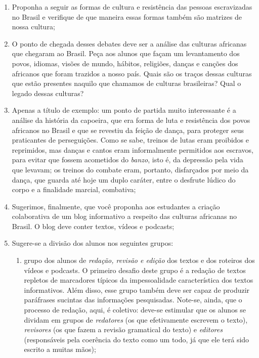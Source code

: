 \documentclass[12pt]{extarticle}
\begin{document}
\begin{enumerate}
\item Proponha a seguir as formas de cultura e resistência das pessoas
escravizadas no Brasil e verifique de que maneira essas formas também
são matrizes de nossa cultura;

\item O ponto de chegada desses debates deve ser a análise das culturas
africanas que chegaram ao Brasil. Peça aos alunos que façam um
levantamento dos povos, idiomas, visões de mundo, hábitos, religiões,
danças e canções dos africanos que foram trazidos a nosso país. Quais
são os traços dessas culturas que estão presentes naquilo que chamamos
de culturas brasileiras? Qual o legado dessas culturas?

\item Apenas a título de exemplo: um ponto de partida muito interessante é
a análise da história da capoeira, que era forma de luta e resistência
dos povos africanos no Brasil e que se revestiu da feição de dança, para
proteger seus praticantes de perseguições. Como se sabe, treinos de
lutas eram proibidos e reprimidos, mas danças e cantos eram
informalmente permitidos aos escravos, para evitar que fossem acometidos
do \emph{banzo}, isto é, da depressão pela vida que levavam; os treinos
do combate eram, portanto, disfarçados por meio da dança, que guarda até
hoje um duplo caráter, entre o desfrute lúdico do corpo e a finalidade
marcial, combativa;

\item Sugerimos, finalmente, que você proponha aos estudantes a criação
colaborativa de um blog informativo a respeito das culturas africanas no
Brasil. O blog deve conter textos, vídeos e podcasts;

\item Sugere-se a divisão dos alunos nos seguintes grupos:

\begin{enumerate}
\item grupo dos alunos de \emph{redação, revisão e edição} dos textos e dos
roteiros dos vídeos e podcasts. O primeiro desafio deste grupo é a
redação de textos repletos de marcadores típicos da impessoalidade
característica dos textos informativos. Além disso, esse grupo também
deve ser capaz de produzir paráfrases sucintas das informações
pesquisadas. Note-se, ainda, que o processo de redação, aqui, é
coletivo: deve-se estimular que os alunos se dividam em grupos de
\emph{redatores} (os que efetivamente escrevem o texto),
\emph{revisores} (os que fazem a revisão gramatical do texto) e
\emph{editores} (responsáveis pela coerência do texto como um todo, já
que ele terá sido escrito a muitas mãos);


\end{enumerate}
\end{enumerate}
\end{document}

